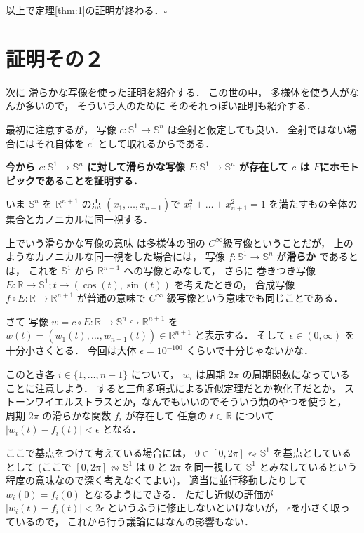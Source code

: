 \documentclass[leqno, a4paper, 12pt]{jsarticle}
\newcommand{\rr}{\mathbb{R}}
\newcommand{\mysp}[1]{\mathbb{S}^{#1}}
\begin{document}
以上で定理\ref{thm:1}の証明が終わる．$\square$


\section{証明その２}
次に
滑らかな写像を使った証明を紹介する．
この世の中，
多様体を使う人がなんか多いので，
そういう人のために
そのそれっぽい証明も紹介する．


最初に注意するが，
写像
$c\colon \mysp{1}\to \mysp{n}$
は全射と仮定しても良い．
全射ではない場合にはそれ自体を
$c^{\prime}$
として取れるからである．



\textbf{今から
$c\colon \mysp{1}\to \mysp{n}$
に対して滑らかな写像
$F\colon \mysp{1}\to \mysp{n}$
が存在して
$c$
は
$F$にホモトピックであることを証明する．}

いま
$\mysp{n}$
を
$\rr^{n+1}$
の点
$(x_{1}, \dots, x_{n+1})$で
$x_{1}^{2}+\dots +x_{n+1}^{2}=1$
を満たすもの全体の集合とカノニカルに同一視する．



上でいう滑らかな写像の意味
は多様体の間の
$C^{\infty}$級写像ということだが，
上のようなカノニカルな同一視をした場合には，
写像
$f\colon \mysp{1}\to \mysp{n}$
が\textbf{滑らか}
であるとは，
これを
$\mysp{1}$
から
$\rr^{n+1}$
への写像とみなして，
さらに
巻きつき写像
$E\colon \rr\to \mysp{1}; t\to (\cos(t), \sin(t))$
を考えたときの，
合成写像
$f\circ E\colon \rr\to \rr^{n+1}$
が普通の意味で
$C^{\infty}$
級写像という意味でも同じことである．




さて
写像
$w=c\circ E\colon \rr\to \mysp{n}\hookrightarrow\rr^{n+1}$
を
$w(t)=(w_{1}(t), \dots, w_{n+1}(t))\in \rr^{n+1}$
と表示する．
そして
$\epsilon\in (0, \infty)$
を十分小さくとる．
今回は大体
$\epsilon =10^{-100}$
くらいで十分じゃないかな．




このとき各
$i\in \{1, \dots, n+1\}$
について，
$w_{i}$
は周期
$2\pi$
の周期関数になっていることに注意しよう．
すると三角多項式による近似定理だとか軟化子だとか，
ストーンワイエルストラスとか，なんでもいいのでそういう類のやつを使うと，
周期
$2\pi$
の滑らかな関数
$f_{i}$
が存在して
任意の
$t\in \rr$
について
$|w_{i}(t)-f_{i}(t)|<\epsilon$
となる．



ここで基点をつけて考えている場合には，
$0\in [0, 2\pi]\leftrightsquigarrow\mysp{1}$
を基点としているとして
(ここで
$[0, 2\pi]\leftrightsquigarrow\mysp{1}$
は
$0$
と
$2\pi$
を同一視して
$\mysp{1}$
とみなしているという程度の意味なので深く考えなくてよい)，
適当に並行移動したりして
$w_{i}(0)=f_{i}(0)$
となるようにできる．
ただし近似の評価が
$|w_{i}(t)-f_{i}(t)|<2\epsilon$
というふうに修正しないといけないが，
$\epsilon$を小さく取っているので，
これから行う議論にはなんの影響もない．
\end{document}
